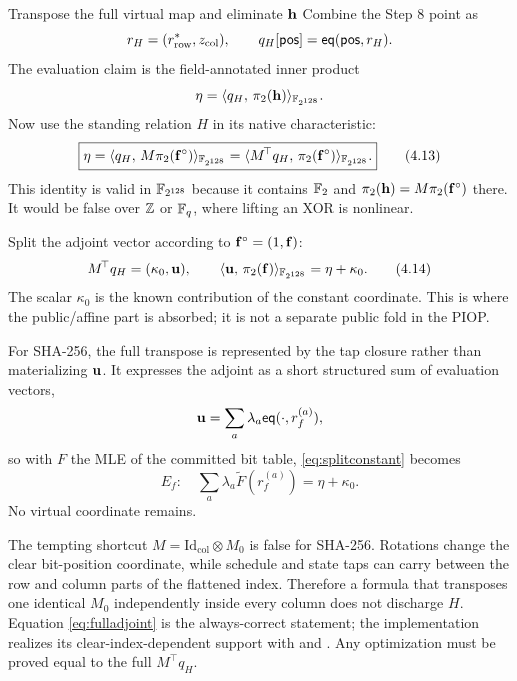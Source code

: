 \begin{step}{Transpose the full virtual map and eliminate $\mathbf{h}$}{%
}\label{step:transpose}
Combine the Step 8 point as
\[
  r_H=(r_{\mathrm{row}}^{*},z_{\mathrm{col}}),
  \qquad
  q_H[\mathsf{pos}]=\mathsf{eq}(\mathsf{pos},r_H).
\]
The evaluation claim is the field-annotated inner product
\[
  \eta=\langle q_H,\, \pi_2(\mathbf{h})\rangle_{\mathbb{F}_{2^{128}}}.
\]
Now use the standing relation $H$ in its native characteristic:
\[
  \boxed{
  \eta
   =\langle q_H,\, M\pi_2(\mathbf{f}^{\circ})\rangle_{\mathbb{F}_{2^{128}}}
   =\langle M^{\!\top}q_H,\, \pi_2(\mathbf{f}^{\circ})\rangle_{\mathbb{F}_{2^{128}}}.}        \tag{4.13}\label{eq:fulladjoint}
\]
This identity is valid in $\mathbb{F}_{2^{128}}$ because it contains $\mathbb{F}_2$ and
$\pi_2(\mathbf{h})=M\pi_2(\mathbf{f}^{\circ})$ there.  It would be false over $\mathbb{Z}$ or
$\mathbb{F}_q$, where lifting an XOR is nonlinear.

Split the adjoint vector according to $\mathbf{f}^{\circ}=(1,\mathbf{f})$:
\[
  M^{\!\top}q_H=(\kappa_0,\mathbf{u}),
  \qquad
  \langle \mathbf{u},\, \pi_2(\mathbf{f})\rangle_{\mathbb{F}_{2^{128}}}=\eta+\kappa_0.               \tag{4.14}\label{eq:splitconstant}
\]
The scalar $\kappa_0$ is the known contribution of the constant coordinate.
This is where the public/affine part is absorbed; it is not a separate public
fold in the PIOP.

For SHA-256, the full transpose is represented by the tap closure rather than
materializing $\mathbf{u}$.  It expresses the adjoint as a short structured sum of
evaluation vectors,
\[
  \mathbf{u}=\sum_a\lambda_a\mathsf{eq}(\cdot,r_f^{(a)}),
\]
so with $F$ the MLE of the committed bit table, \eqref{eq:splitconstant} becomes
\[
  \boxed{
  E_f:\quad
  \sum_a\lambda_a\widetilde F(r_f^{(a)})
  =\eta+\kappa_0.}                                  \tag{4.15}\label{eq:committedclaim}
\]
No virtual coordinate remains.

\begin{warning}
\label{warn:mblockdiag}
The tempting shortcut
$M=\mathrm{Id}_{\mathrm{col}}\otimes M_0$ is false for SHA-256.  Rotations
change the clear bit-position coordinate, while schedule and state taps can
carry between the row and column parts of the flattened index.  Therefore a
formula that transposes one identical $M_0$ independently inside every column
does not discharge $H$.  Equation \eqref{eq:fulladjoint} is the always-correct statement;
the implementation realizes its clear-index-dependent support with
 and .
Any optimization must be proved equal to the full $M^{\!\top}q_H$.
\end{warning}

\end{step}

